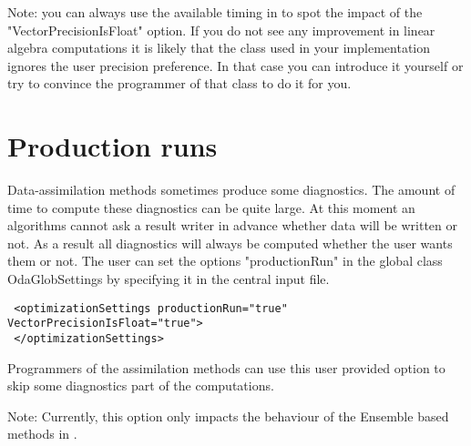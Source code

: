Note: you can always use the available timing in \oda to spot the impact of the "VectorPrecisionIsFloat" option. If you do not see any improvement in linear algebra computations it is likely that the class used in your implementation ignores the user precision preference. In that case you can introduce it yourself or try to convince the programmer of that class to do it for you.

\section{Production runs}
Data-assimilation methods sometimes produce some diagnostics. The amount of time to compute these diagnostics can be quite large. At this moment an algorithms cannot ask a result writer in advance whether data will be written or not. As a result all diagnostics will always be computed whether the user wants them or not. The user can set the options "productionRun" in the global class OdaGlobSettings by specifying it in the central input file.

{\footnotesize
\begin{verbatim}
 <optimizationSettings productionRun="true" VectorPrecisionIsFloat="true">
 </optimizationSettings>
\end{verbatim}}  
Programmers of the assimilation methods can use this user provided option to skip some diagnostics part of the computations.

Note: Currently, this option only impacts the behaviour of the Ensemble based methods in \oda.
 





